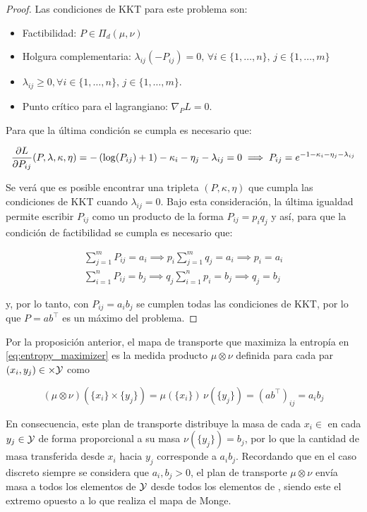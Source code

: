 \begin{proof}
	Las condiciones de KKT para este problema son:

	\begin{itemize}
		\item Factibilidad: $P \in\Pi_d(\mu,\nu)$
		\item Holgura complementaria: $\lambda_{ij}(-P_{ij})=0,\, \forall i\in\{1,\ldots,n\},\, j\in\{1,\ldots,m\}$
		\item $\lambda_{ij}\geq 0, \forall i\in\{1,\ldots,n\},\, j\in\{1,\ldots,m\}$.
		\item Punto crítico para el lagrangiano: $\nabla_P L = 0$.
	\end{itemize}

	Para que la última condición se cumpla es necesario que:

	\begin{equation*}
		\frac{\partial L}{\partial P_{ij}}(P,\lambda,\kappa,\eta) = -\left(\log(P_{ij})+1\right) - \kappa_i - \eta_j - \lambda_{ij} = 0 \implies P_{ij} = e^{-1 - \kappa_i - \eta_j - \lambda_{ij}}
	\end{equation*}

	Se verá que es posible encontrar una tripleta $(P,\kappa,\eta)$ que cumpla las condiciones de KKT cuando $\lambda_{ij}=0$. Bajo esta consideración, la última igualdad permite escribir $P_{ij}$ como un producto de la forma $P_{ij} = p_i q_j$ y así, para que la condición de factibilidad se cumpla es necesario que:

	\begin{align*}
		\sum_{j=1}^m P_{ij} = a_i \implies p_i \sum_{j=1}^m q_j = a_i \implies p_i = a_i \\
		\sum_{i=1}^n P_{ij} = b_j \implies q_j \sum_{i=1}^n p_i = b_j \implies q_j = b_j
	\end{align*}

	y, por lo tanto, con $P_{ij} = a_i b_j$ se cumplen todas las condiciones de KKT, por lo que $P=ab^\top$ es un máximo del problema.
\end{proof}

Por la proposición anterior, el mapa de transporte que maximiza la entropía en \eqref{eq:entropy_maximizer} es la medida producto $\mu\otimes\nu$ definida para cada par $(x_i,y_j)\in\times\mathcal{Y}$ como

\begin{equation*}
	(\mu\otimes\nu)(\{x_i\}\times\{y_j\}) = \mu(\{x_i\})\,\nu(\{y_j\}) = (ab^\top)_{ij} = a_i b_j
\end{equation*}

En consecuencia, este plan de transporte distribuye la masa de cada $x_i\in\xspace$ en cada $y_j\in\mathcal{Y}$ de forma proporcional a su masa $\nu(\{y_j\})=b_j$, por lo que la cantidad de masa transferida desde $x_i$ hacia $y_j$ corresponde a $a_i b_j$. Recordando que en el caso discreto siempre se considera que $a_i,b_j>0$, el plan de transporte $\mu\otimes\nu$ envía masa a todos los elementos de $\mathcal{Y}$ desde todos los elementos de $\xspace$, siendo este el extremo opuesto a lo que realiza el mapa de Monge.

